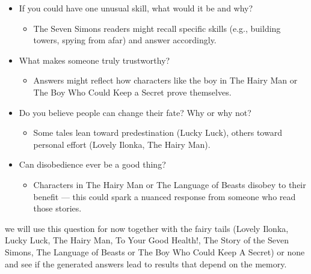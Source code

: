 \documentclass[11pt]{article}
\begin{document}
\begin{itemize}
\item If you could have one unusual skill, what would it be and why?
\begin{itemize}
\item The Seven Simons readers might recall specific skills (e.g., building towers, spying from afar) and answer accordingly.
\end{itemize}

\item What makes someone truly trustworthy?
\begin{itemize}
\item Answers might reflect how characters like the boy in The Hairy Man or The Boy Who Could Keep a Secret prove themselves.
\end{itemize}

\item Do you believe people can change their fate? Why or why not?
\begin{itemize}
\item Some tales lean toward predestination (Lucky Luck), others toward personal effort (Lovely Ilonka, The Hairy Man).
\end{itemize}

\item Can disobedience ever be a good thing?
\begin{itemize}
\item Characters in The Hairy Man or The Language of Beasts disobey to their benefit — this could spark a nuanced response from someone who read those stories.
\end{itemize}

\end{itemize}

we will use this question for now together with the fairy tails (Lovely Ilonka, Lucky Luck, The Hairy Man, To Your Good Health!, The Story of the Seven Simons, The Language of Beasts or The Boy Who Could Keep A Secret) or none and see if the generated answers lead to results that depend on the memory. 



\end{document}
